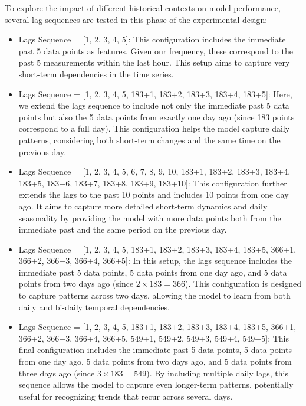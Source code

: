 To explore the impact of different historical contexts on model performance, several lag sequences are tested in this phase of the experimental design:

\begin{itemize}
    \item Lags Sequence = [1, 2, 3, 4, 5]:  
    This configuration includes the immediate past 5 data points as features. Given our frequency, these correspond to the past 5 measurements within the last hour. This setup aims to capture very short-term dependencies in the time series.
    
    \item Lags Sequence = [1, 2, 3, 4, 5, 183+1, 183+2, 183+3, 183+4, 183+5]:  
    Here, we extend the lags sequence to include not only the immediate past 5 data points but also the 5 data points from exactly one day ago (since 183 points correspond to a full day). This configuration helps the model capture daily patterns, considering both short-term changes and the same time on the previous day.
    
    \item Lags Sequence = [1, 2, 3, 4, 5, 6, 7, 8, 9, 10, 183+1, 183+2, 183+3, 183+4, 183+5, 183+6, 183+7, 183+8, 183+9, 183+10]:  
    This configuration further extends the lags to the past 10 points and includes 10 points from one day ago. It aims to capture more detailed short-term dynamics and daily seasonality by providing the model with more data points both from the immediate past and the same period on the previous day.
    
    \item Lags Sequence = [1, 2, 3, 4, 5, 183+1, 183+2, 183+3, 183+4, 183+5, 366+1, 366+2, 366+3, 366+4, 366+5]:  
    In this setup, the lags sequence includes the immediate past 5 data points, 5 data points from one day ago, and 5 data points from two days ago (since \(2 \times 183 = 366\)). This configuration is designed to capture patterns across two days, allowing the model to learn from both daily and bi-daily temporal dependencies.
    
    \item Lags Sequence = [1, 2, 3, 4, 5, 183+1, 183+2, 183+3, 183+4, 183+5, 366+1, 366+2, 366+3, 366+4, 366+5, 549+1, 549+2, 549+3, 549+4, 549+5]:  
    This final configuration includes the immediate past 5 data points, 5 data points from one day ago, 5 data points from two days ago, and 5 data points from three days ago (since \(3 \times 183 = 549\)). By including multiple daily lags, this sequence allows the model to capture even longer-term patterns, potentially useful for recognizing trends that recur across several days.
\end{itemize}

